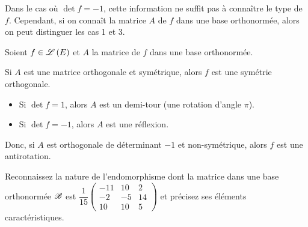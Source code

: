 Dans le cas où \(\det f=-1\), cette information ne suffit pas à connaître le type de \(f\). Cependant, si on connaît la matrice \(A\) de \(f\) dans une base orthonormée, alors on peut distinguer les cas 1 et 3.

\begin{prop}
Soient \(f\in\mathscr{L}\left(E\right)\) et \(A\) la matrice de \(f\) dans une base orthonormée.

Si \(A\) est une matrice orthogonale et symétrique, alors \(f\) est une symétrie orthogonale.

\begin{itemize}
    \item Si \(\det f=1\), alors \(A\) est un demi-tour (une rotation d'angle \(\pi\)). \\
    \item Si \(\det f=-1\), alors \(A\) est une réflexion.
\end{itemize}
\end{prop}

Donc, si \(A\) est orthogonale de déterminant \(-1\) et non-symétrique, alors \(f\) est une antirotation.

\begin{exo}
Reconnaissez la nature de l'endomorphisme dont la matrice dans une base orthonormée \(\mathscr{B}\) est \(\dfrac{1}{15}\begin{pmatrix}
-11 & 10 & 2 \\
-2 & -5 & 14 \\
10 & 10 & 5
\end{pmatrix}\) et précisez ses éléments caractéristiques.
\end{exo}

